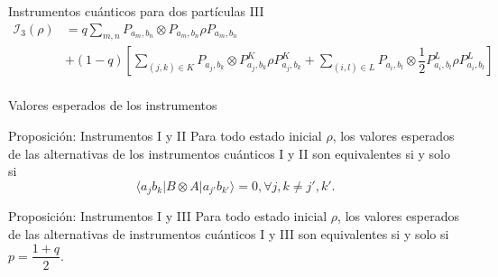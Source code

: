 \documentclass[svgnames,12pt,aspectratio=149]{beamer}
\newcommand{\ra}{\rangle}
\newcommand{\la}{\langle}
\begin{document}
\begin{frame}{Instrumentos cuánticos para dos partículas III}
  \begin{equation*}\label{eq:quantum-instrument-3-desarrollo}
    \begin{split}
        \mathcal{I}_3(\rho)&=q\sum_{m,n}  P_{a_m,b_n}\otimes P_{a_m,b_n}\rho P_{a_m,b_n}\\
        &+(1-q)\left[\sum_{(j,k)\in K}P_{a_j,b_k} \otimes P^{K}_{a_j,b_k}\rho P^{K}_{a_j,b_k}+\sum_{(i,l) \in L}P_{a_i,b_l} \otimes  \dfrac{1}{2}P^{L}_{a_i,b_l}\rho P^L_{a_i,b_l}\right]\\
    \end{split}
\end{equation*}
\begin{figure}[H]
    \centering
{}
\caption*{} 
\end{figure} 
\end{frame}

\begin{frame}{Valores esperados de los instrumentos}
  \begin{block}{Proposición: Instrumentos I y II}
    Para todo estado inicial $\rho$, los valores esperados de las alternativas
de los instrumentos cuánticos I y II son equivalentes si y solo si \begin{equation*}\label{eq:Condicion-equivalencia1-2}
    \la a_j
b_k|B\otimes A|a_{j'}b_{k'}\ra=0, \forall j,k\ne j',k'.
\end{equation*}
\end{block}



\begin{block}{Proposición: Instrumentos I y III}
    Para todo estado inicial $\rho$, los valores esperados de las alternativas
de instrumentos cuánticos I y III son equivalentes si y solo si
$p=\dfrac{1+q}{2}$.
\end{block}
\end{frame}
\end{document}
